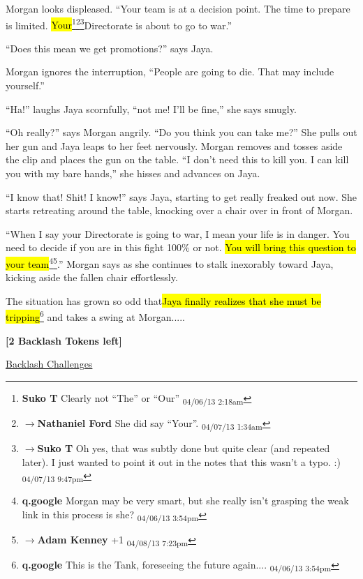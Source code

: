 Morgan looks displeased.  ``Your team is at a decision point.  The time to prepare is limited.  \hl{Your}\footnote{\textbf{Suko T }Clearly not ``The'' or ``Our'' \textsubscript{04/06/13 2:18am}}\footnote{$\rightarrow$\textbf{Nathaniel Ford }She did say ``Your''. \textsubscript{04/07/13 1:34am}}\footnote{$\rightarrow$\textbf{Suko T }Oh yes, that was subtly done but quite clear (and repeated later).  I just wanted to point it out in the notes that this wasn't a typo.  :) \textsubscript{04/07/13 9:47pm}}Directorate is about to go to war.''

``Does this mean we get promotions?'' says Jaya.

Morgan ignores the interruption, ``People are going to die.  That may include yourself.''

``Ha!'' laughs Jaya scornfully, ``not me!  I'll be fine,'' she says smugly.

``Oh really?'' says Morgan angrily.  ``Do you think you can take me?''  She pulls out her gun and Jaya leaps to her feet nervously.  Morgan removes and tosses aside the clip and places the gun on the table.  ``I don't need this to kill you.  I can kill you with my bare hands,'' she hisses and advances on Jaya.

``I know that!  Shit!  I know!'' says Jaya, starting to get really freaked out now.  She starts retreating around the table, knocking over a chair over in front of Morgan.

``When I say your Directorate is going to war, I mean your life is in danger.  You need to decide if you are in this fight 100\% or not.  \hl{You will bring this question to your team}\footnote{\textbf{q.google }Morgan may be very smart, but she really isn't grasping the weak link in this process is she? \textsubscript{04/06/13 3:54pm}}\footnote{$\rightarrow$\textbf{Adam Kenney }+1 \textsubscript{04/08/13 7:23pm}}.''  Morgan says as she continues to stalk inexorably toward Jaya, kicking aside the fallen chair effortlessly.



The situation has grown so odd that\hl{Jaya finally realizes that she must be tripping}\footnote{\textbf{q.google }This is the Tank, foreseeing the future again.... \textsubscript{04/06/13 3:54pm}} and takes a swing at Morgan.....



\textbf{{[}2 Backlash Tokens left{]}}



\underline{  {\LARGE Backlash Challenges }  }



